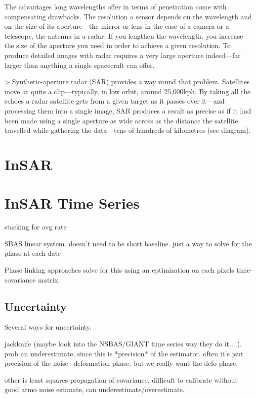 \documentclass{utexasthesis}
\begin{document}
The advantages long wavelengths offer in terms of penetration come with compensating drawbacks. The resolution a sensor depends on the wavelength and on the size of its aperture—the mirror or lens in the case of a camera or a telescope, the antenna in a radar. If you lengthen the wavelength, you increase the size of the aperture you need in order to achieve a given resolution. To produce detailed images with radar requires a very large aperture indeed—far larger than anything a single spacecraft can offer.

> Synthetic-aperture radar (SAR) provides a way round that problem. Satellites move at quite a clip—typically, in low orbit, around 25,000kph. By taking all the echoes a radar satellite gets from a given target as it passes over it—and processing them into a single image, SAR produces a result as precise as if it had been made using a single aperture as wide across as the distance the satellite travelled while gathering the data—tens of hundreds of kilometres (see diagram).

\section{InSAR}

\section{InSAR Time Series}

stacking for avg rate

SBAS linear system. doesn't need to be short baseline. just a way to solve for the phase at each date

Phase linking approaches solve for this using an eptimization on each pixels time-covariance matrix.

\subsection{Uncertainty}

Several ways for uncertainty.

jackknife (maybe look into the NSBAS/GIANT time series way they do it....). prob an underestimate, since this is *precision* of the estimator. often it's jsut precision of the noise+deformation phase. but we really want the defo phase.

other is least squares propagation of covariance. difficult to calibrate without good atmo noise estimate, can underestimate/overestimate.
\end{document}
